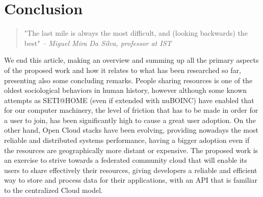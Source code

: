 \chapter{Conclusion}\label{ch:conclusion}

\begin{quotation}
  "The last mile is always the most difficult, and (looking backwards) the best"
  {\small\it -- Miguel Mira Da Silva, professor at IST}
\end{quotation}

We end this article, making an overview and summing up all the primary aspects of the proposed work and how it relates to what has been researched so far, presenting also some concluding remarks.
People sharing resources is one of the oldest sociological behaviors in human history, however although some known attempts as SETI@HOME (even if extended with nuBOINC) have enabled that for our computer machinery, the level of friction that has to be made in order for a user to join, has been significantly high to cause a great user adoption. On the other hand, Open Cloud stacks have been evolving, providing nowadays the most reliable and distributed systems performance, having a bigger adoption even if the resources are geographically more distant or expensive.
The proposed work is an exercise to strive towards a federated community cloud that will enable its users to share effectively their resources, giving developers a reliable and efficient way to store and process data for their applications, with an API that is familiar to the centralized Cloud model.

